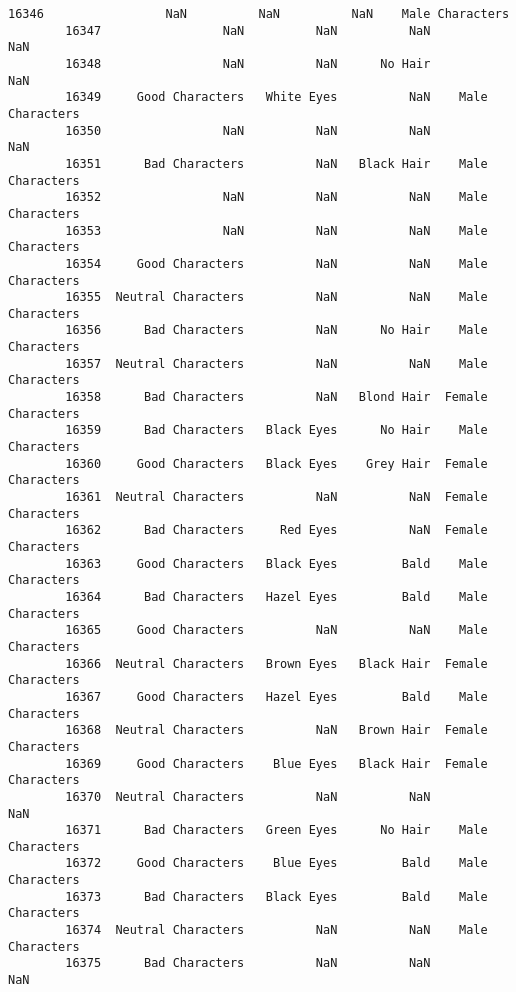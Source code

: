 \documentclass[11pt]{article}
\begin{document}
\begin{Verbatim}[commandchars=\\\{\}]
        16346                 NaN          NaN          NaN    Male Characters   
        16347                 NaN          NaN          NaN                NaN   
        16348                 NaN          NaN      No Hair                NaN   
        16349     Good Characters   White Eyes          NaN    Male Characters   
        16350                 NaN          NaN          NaN                NaN   
        16351      Bad Characters          NaN   Black Hair    Male Characters   
        16352                 NaN          NaN          NaN    Male Characters   
        16353                 NaN          NaN          NaN    Male Characters   
        16354     Good Characters          NaN          NaN    Male Characters   
        16355  Neutral Characters          NaN          NaN    Male Characters   
        16356      Bad Characters          NaN      No Hair    Male Characters   
        16357  Neutral Characters          NaN          NaN    Male Characters   
        16358      Bad Characters          NaN   Blond Hair  Female Characters   
        16359      Bad Characters   Black Eyes      No Hair    Male Characters   
        16360     Good Characters   Black Eyes    Grey Hair  Female Characters   
        16361  Neutral Characters          NaN          NaN  Female Characters   
        16362      Bad Characters     Red Eyes          NaN  Female Characters   
        16363     Good Characters   Black Eyes         Bald    Male Characters   
        16364      Bad Characters   Hazel Eyes         Bald    Male Characters   
        16365     Good Characters          NaN          NaN    Male Characters   
        16366  Neutral Characters   Brown Eyes   Black Hair  Female Characters   
        16367     Good Characters   Hazel Eyes         Bald    Male Characters   
        16368  Neutral Characters          NaN   Brown Hair  Female Characters   
        16369     Good Characters    Blue Eyes   Black Hair  Female Characters   
        16370  Neutral Characters          NaN          NaN                NaN   
        16371      Bad Characters   Green Eyes      No Hair    Male Characters   
        16372     Good Characters    Blue Eyes         Bald    Male Characters   
        16373      Bad Characters   Black Eyes         Bald    Male Characters   
        16374  Neutral Characters          NaN          NaN    Male Characters   
        16375      Bad Characters          NaN          NaN                NaN   
        

\end{Verbatim}
\end{document}
